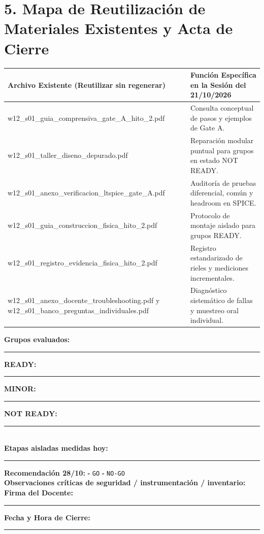\documentclass[10pt, a4paper]{article}
\begin{document}
\section*{5. Mapa de Reutilización de Materiales Existentes y Acta de Cierre}
\begin{table}[htbp]
    \centering
    \scriptsize
    \renewcommand{\arraystretch}{1.22}
    \begin{tabularx}{\textwidth}{|P{6.8cm}|Y|}
    \hline
    \textbf{Archivo Existente (Reutilizar sin regenerar)} & \textbf{Función Específica en la Sesión del 21/10/2026} \\ \hline
    {\ttfamily w12\_s01\_guia\_comprensiva\_gate\_A\_hito\_2.pdf} & Consulta conceptual de pasos y ejemplos de Gate A. \\ \hline
    {\ttfamily w12\_s01\_taller\_diseno\_depurado.pdf} & Reparación modular puntual para grupos en estado {\ttfamily NOT READY}. \\ \hline
    {\ttfamily w12\_s01\_anexo\_verificacion\_ltspice\_gate\_A.pdf} & Auditoría de pruebas diferencial, común y headroom en SPICE. \\ \hline
    {\ttfamily w12\_s01\_guia\_construccion\_fisica\_hito\_2.pdf} & Protocolo de montaje aislado para grupos {\ttfamily READY}. \\ \hline
    {\ttfamily w12\_s01\_registro\_evidencia\_fisica\_hito\_2.pdf} & Registro estandarizado de rieles y mediciones incrementales. \\ \hline
    {\ttfamily w12\_s01\_anexo\_docente\_troubleshooting.pdf} y {\ttfamily w12\_s01\_banco\_preguntas\_individuales.pdf} & Diagnóstico sistemático de fallas y muestreo oral individual. \\ \hline
    \end{tabularx}
\end{table}

\begin{tcolorbox}[colback=neutralbg, colframe=black, boxsep=2pt, top=3pt, bottom=3pt, title=\textbf{Síntesis Docente de Cierre de Sesión (21/10/2026)}]
    \footnotesize\raggedright
    \textbf{Grupos evaluados:} \rule{2.0cm}{0.4pt} \hfill \textbf{READY:} \rule{2.0cm}{0.4pt} \hfill \textbf{MINOR:} \rule{2.0cm}{0.4pt} \hfill \textbf{NOT READY:} \rule{2.0cm}{0.4pt} \\[0.15cm]
    \textbf{Etapas aisladas medidas hoy:} \rule{2.2cm}{0.4pt} \hfill \textbf{Recomendación 28/10:} $\square$ \texttt{GO} \quad $\square$ \texttt{NO-GO} \\[0.15cm]
    \textbf{Observaciones críticas de seguridad / instrumentación / inventario:} \hrulefill \\[0.15cm]
    \textbf{Firma del Docente:} \rule{5cm}{0.4pt} \hfill \textbf{Fecha y Hora de Cierre:} \rule{4cm}{0.4pt}
\end{tcolorbox}
\end{document}
